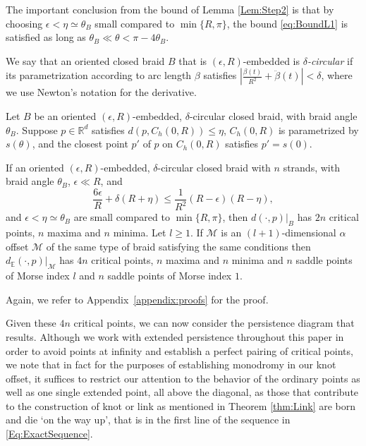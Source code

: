 \documentclass[twoside,leqno]{article}
\newcommand{\M}{\mathcal{M}}
\begin{document}
\begin{remark}\label{Rem:ThetaEqZeroOrPi} 
The important conclusion from the bound of Lemma \ref{Lem:Step2} is that by choosing $\epsilon< \eta \simeq \theta_B$ small compared to $\min \{  R, \pi\}$, the bound \eqref{eq:BoundL1} is satisfied as long as $\theta_B \ll  \theta < \pi - 4 \theta_B$. %
\end{remark} 


%
%
%
%
%
%


We say that an oriented closed braid $B$ that is $(\epsilon , R)$-embedded is \emph{$\delta$-circular} if its parametrization according to arc length $\beta$ satisfies $\left|\frac{\beta (t)}{R^2} +  \ddot{\beta} (t)  \right| <  \delta$, where we use Newton's notation for the derivative. 



\begin{lemma} \label{Lem:Step3} 
Let $B$ be an oriented  $(\epsilon , R)$-embedded, $\delta$-circular closed braid, with braid angle $\theta_B$. 
Suppose $p \in \mathbb{R}^d$ satisfies $d (p, C_h(0,R)) \leq \eta$, $C_h(0,R)$ is parametrized by $s(\theta)$, and the closest point $p'$ of $p$ on $C_h(0,R)$ satisfies $p' =s(0)$.
 
%
%
%
%
%
%
%
%
%
%
%
%
%
%
%
If an oriented  $(\epsilon , R)$-embedded, $\delta$-circular closed braid with $n$ strands, with braid angle $\theta_B$,
%
%
$\epsilon \ll R $, and  
\[ 
\frac{6\epsilon}{R} + \delta (R+\eta) \leq \frac{1}{R^2} ( R- \epsilon) ( R- \eta) ,
\] 
and $\epsilon< \eta \simeq \theta_B$ are small compared to $\min \{  R, \pi\}$, 
then $d(\cdot ,p)|_B$ has $2n$ critical points, $n$ maxima and $n$ minima.  
Let $l\geq 1$. If $\M$ is an $(l+1)$-dimensional $\alpha$ offset $\M$ of the same type of braid satisfying the same conditions then $d_\mathbb{E}(\cdot ,p)|_\M$ has $4n$ critical points, $n$ maxima and $n$ minima and $n$ saddle points of Morse index $l$ {and $n$ saddle points of Morse index $1$}.  
\end{lemma} 

%
%
%
%
%
%
%
%
%
%
%
%
%
%
%
%
%
%
%
%
%

%

Again, we refer to Appendix~\ref{appendix:proofs} for the proof.



%
%
%
%
%
%

Given these $4n$ critical points, we can now consider the persistence diagram that results.  Although we work with extended persistence throughout this paper in order to avoid points at infinity and establish a perfect pairing of critical points, we note that in fact for the purposes of establishing monodromy in our knot offset, it suffices to restrict our attention to the behavior of the ordinary points as well as one single extended point, all above the diagonal, as those that contribute to the construction of knot or link as mentioned in Theorem \ref{thm:Link} are born and die `on the way up',  that is in the first line of the sequence in \eqref{Eq:ExactSequence}. 
\end{document}
